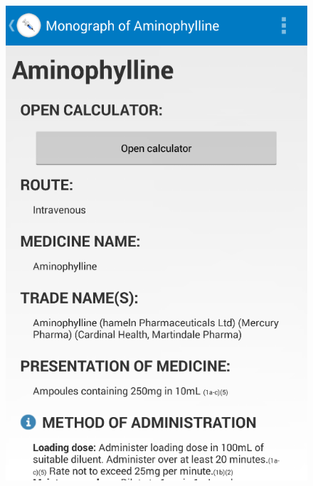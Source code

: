 \begin{figure}[H]
\begin{minipage}{.5\textwidth}
  \includegraphics[width=.8\linewidth]{Images/screenshots/API18/view.png}
\end{minipage}
\end{figure}

